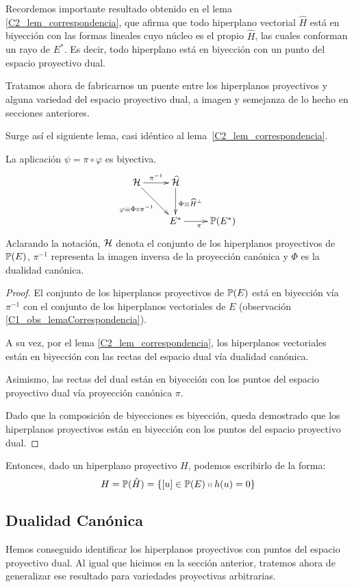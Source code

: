 Recordemos importante resultado obtenido en el lema \ref{C2_lem_correspondencia}, que afirma que todo hiperplano  vectorial $\widehat{H}$ está en biyección con las formas lineales cuyo núcleo es el propio $\widehat{H}$, las cuales conforman un rayo de $E^*$. Es decir, todo hiperplano está en biyección con un punto del espacio proyectivo dual.

Tratamos ahora de fabricarnos un puente entre los hiperplanos proyectivos y alguna variedad del espacio proyectivo dual, a imagen y semejanza de lo hecho en secciones anteriores.

Surge así el siguiente lema, casi idéntico al lema~\ref{C2_lem_correspondencia}.
\begin{lem}
	\label{C2_lem_correspondenciaProy}
	La aplicación $\psi=\pi\circ\varphi$ es biyectiva.
	\begin{equation*}
		\xymatrix{
			\mc{H} \ar[r]^{\pi^{-1}} \ar[rd]_{\varphi\equiv\Phi\circ\pi^{-1}} & \widehat{\mc{H}}\ar[d]^{\Phi\equiv\widehat{H}^{\perp}}\\
			 & E^* \ar[r]_{\pi} & \proy(E^*)
		}
	\end{equation*}
	Aclarando la notación, $\mathcal{H}$ denota el conjunto de los hiperplanos proyectivos de $\mathbb{P}(E)$, $\pi^{-1}$ representa la imagen inversa de la proyección canónica y $\Phi$ es la dualidad canónica.
\end{lem}
\begin{proof}
	El conjunto de los hiperplanos proyectivos de $\mathbb{P}(E)$ está en biyección vía $\pi^{-1}$ con el conjunto de los hiperplanos vectoriales de $E$ (observación \ref{C1_obs_lemaCorrespondencia}).
	
	A su vez, por el lema \ref{C2_lem_correspondencia}, los hiperplanos vectoriales están en biyección con las rectas del espacio dual vía dualidad canónica.
	
	Asimismo, las rectas del dual están en biyección con los puntos del espacio proyectivo dual vía proyección canónica $\pi$.
	
	Dado que la composición de biyecciones es biyección, queda demostrado que los hiperplanos proyectivos están en biyección con los puntos del espacio proyectivo dual.
\end{proof}
Entonces, dado un hiperplano proyectivo $H$, podemos escribirlo de la forma:
\begin{equation}
H=\mathbb{P}(\hat{H})=\{[u]\in\mathbb{P}(E)\shortparallel h(u)=0\}
\end{equation}

\subsection{Dualidad Canónica}
Hemos conseguido identificar los hiperplanos proyectivos con puntos del espacio proyectivo dual. Al igual que hicimos en la sección anterior, tratemos ahora de generalizar ese resultado para variedades proyectivas arbitrarias.

